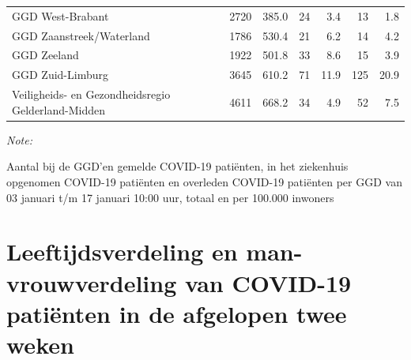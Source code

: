 \documentclass[
  english,
  man,floatsintext]{apa6}
\begin{document}
\begin{table}[H]
\begin{threeparttable}
\begin{tabular}{lrrrrrr}
GGD West-Brabant & 2720 & 385.0 & 24 & 3.4 & 13 & 1.8\\
GGD Zaanstreek/Waterland & 1786 & 530.4 & 21 & 6.2 & 14 & 4.2\\
GGD Zeeland & 1922 & 501.8 & 33 & 8.6 & 15 & 3.9\\
GGD Zuid-Limburg & 3645 & 610.2 & 71 & 11.9 & 125 & 20.9\\
Veiligheids- en Gezondheidsregio Gelderland-Midden & 4611 & 668.2 & 34 & 4.9 & 52 & 7.5\\
\bottomrule
\end{tabular}
\begin{tablenotes}
\item \textit{Note: } 
\item Aantal bij de GGD’en gemelde COVID-19 patiënten, in het ziekenhuis opgenomen COVID-19 patiënten en overleden COVID-19 patiënten per GGD van 03 januari t/m 17 januari 10:00 uur, totaal en per 100.000 inwoners
\end{tablenotes}
\end{threeparttable}
\endgroup{}
\end{table}

\newpage

\hypertarget{leeftijdsverdeling-en-man-vrouwverdeling-van-covid-19-patiuxebnten-in-de-afgelopen-twee-weken}{%
\section{Leeftijdsverdeling en man-vrouwverdeling van COVID-19 patiënten in de afgelopen twee weken}\label{leeftijdsverdeling-en-man-vrouwverdeling-van-covid-19-patiuxebnten-in-de-afgelopen-twee-weken}}
\end{document}
